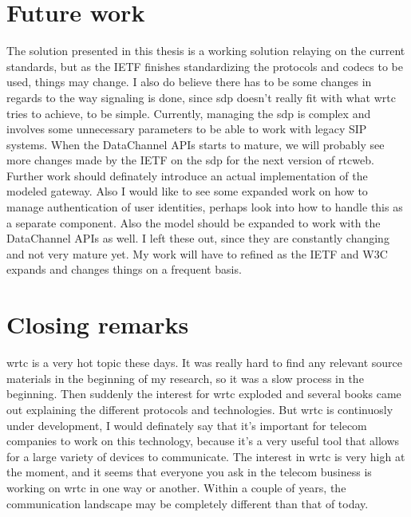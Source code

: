 \section{Future work}
The solution presented in this thesis is a working solution relaying on the current standards, but as the IETF finishes standardizing the protocols and codecs to be used, things may change. I also do believe there has to be some changes in regards to the way signaling is done, since \gls{sdp} doesn't really fit with what \gls{wrtc} tries to achieve, to be simple. Currently, managing the \gls{sdp} is complex and involves some unnecessary parameters to be able to work with legacy SIP systems. When the DataChannel APIs starts to mature, we will probably see more changes made by the IETF on the \gls{sdp} for the next version of \gls{rtcweb}. Further work should definately introduce an actual implementation of the modeled gateway. Also I would like to see some expanded work on how to manage authentication of user identities, perhaps look into how to handle this as a separate component. Also the model should be expanded to work with the DataChannel APIs as well. I left these out, since they are constantly changing and not very mature yet. My work will have to refined as the IETF and W3C expands and changes things on a frequent basis.

\section{Closing remarks}
\gls{wrtc} is a very hot topic these days. It was really hard to find any relevant source materials in the beginning of my research, so it was a slow process in the beginning. Then suddenly the interest for \gls{wrtc} exploded and several books came out explaining the different protocols and technologies. But \gls{wrtc} is continuosly under development, I would definately say that it's important for telecom companies to work on this technology, because it's a very useful tool that allows for a large variety of devices to communicate. The interest in \gls{wrtc} is very high at the moment, and it seems that everyone you ask in the telecom business is working on \gls{wrtc} in one way or another. Within a couple of years, the communication landscape may be completely different than that of today.